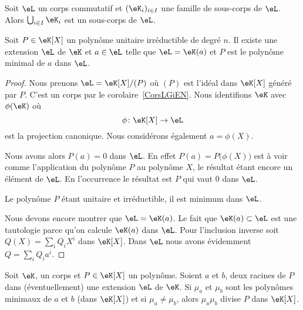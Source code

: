 \begin{lemma}       \label{LEMooIPAXooCNGMQT}
	Soit \( \eL\) un corps commutatif et \( (\eK_i)_{i\in I}\) une famille de sous-corps de \( \eL\). Alors \( \bigcup_{i\in I}\eK_i\) est un sous-corps de \( \eL\).
\end{lemma}

\begin{lemma}
	Soit \( P\in\eK[X]\) un polynôme unitaire irréductible de degré \( n\). Il existe une extension \( \eL\) de \( \eK\) et \( a\in \eL\) telle que \( \eL=\eK(a)\) et \( P\) est le polynôme minimal de \( a\) dans \( \eL\).
\end{lemma}

\begin{proof}
	Nous prenons \( \eL=\eK[X]/(P)\) où \( (P)\) est l'idéal dans \( \eK[X]\) généré par \( P\). C'est un corps par le corolaire~\ref{CorsLGiEN}. Nous identifions \( \eK\) avec \( \phi(\eK)\) où
	\begin{equation}
		\phi\colon \eK[X]\to \eL
	\end{equation}
	est la projection canonique. Nous considérons également \( a=\phi(X)\).

	Nous avons alors \( P(a)=0\) dans \( \eL\). En effet \( P(a)=P\big( \phi(X) \big)\) est à voir comme l'application du polynôme \( P\) au polynôme \( X\), le résultat étant encore un élément de \( \eL\). En l'occurrence le résultat est \( P\) qui vaut \( 0\) dans \( \eL\).

	Le polynôme \( P\) étant unitaire et irréductible, il est minimum dans \( \eL\).

	Nous devons encore montrer que \( \eL=\eK(a)\). Le fait que \( \eK(a)\subset \eL\) est une tautologie parce qu'on calcule \( \eK(a)\) dans \( \eL\). Pour l'inclusion inverse soit \( Q(X)=\sum_iQ_iX^i\) dans \( \eK[X]\). Dans \( \eL\) nous avons évidemment \( Q=\sum_iQ_ia^i\).
\end{proof}

\begin{proposition} \label{PropyMTEbH}
	Soit \( \eK\), un corps et \( P\in \eK[X]\) un polynôme. Soient \( a\) et \( b\), deux racines de \( P\) dans (éventuellement) une extension \( \eL\) de \( \eK\). Si \( \mu_a\) et \( \mu_b\) sont les polynômes minimaux de \( a\) et \( b\) (dans \( \eK[X]\)) et si \( \mu_a\neq \mu_b\), alors \( \mu_a\mu_b\) divise \( P\) dans \( \eK[X]\).
\end{proposition}

